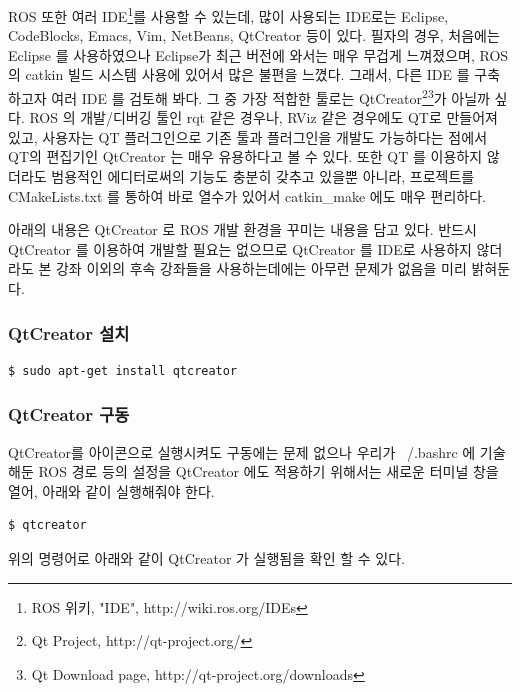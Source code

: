 ROS 또한 여러 IDE\footnote{ROS 위키, "IDE", http://wiki.ros.org/IDEs}를 사용할 수 있는데, 많이 사용되는 IDE로는 Eclipse, CodeBlocks, Emacs, Vim, NetBeans, QtCreator 등이 있다. 필자의 경우, 처음에는 Eclipse 를 사용하였으나 Eclipse가 최근 버전에 와서는 매우 무겁게 느껴졌으며, ROS의 catkin 빌드 시스템 사용에 있어서 많은 불편을 느꼈다. 그래서, 다른 IDE 를 구축하고자 여러 IDE 를 검토해 봐다. 그 중 가장 적합한 툴로는 QtCreator\footnote{Qt Project, http://qt-project.org/}\footnote{Qt Download page, http://qt-project.org/downloads}가 아닐까 싶다. ROS 의 개발/디버깅 툴인 rqt 같은 경우나, RViz 같은 경우에도 QT로 만들어져 있고, 사용자는 QT 플러그인으로 기존 툴과 플러그인을 개발도 가능하다는 점에서 QT의 편집기인 QtCreator 는 매우 유용하다고 볼 수 있다. 또한 QT 를 이용하지 않더라도 범용적인 에디터로써의 기능도 충분히 갖추고 있을뿐 아니라, 프로젝트를 CMakeLists.txt 를 통하여 바로 열수가 있어서 catkin\_make 에도 매우 편리하다.

아래의 내용은 QtCreator 로 ROS 개발 환경을 꾸미는 내용을 담고 있다. 반드시 QtCreator 를 이용하여 개발할 필요는 없으므로 QtCreator 를 IDE로 사용하지 않더라도 본 강좌 이외의 후속 강좌들을 사용하는데에는 아무런 문제가 없음을 미리 밝혀둔다.

\subsubsection{QtCreator 설치}

\begin{lstlisting}[language=ROS]
$ sudo apt-get install qtcreator
\end{lstlisting}

\subsubsection{QtCreator 구동}
QtCreator를 아이콘으로 실행시켜도 구동에는 문제 없으나 우리가 ~/.bashrc 에 기술해둔 ROS 경로 등의 설정을 QtCreator 에도 적용하기 위해서는 새로운 터미널 창을 열어, 아래와 같이 실행해줘야 한다.

\begin{lstlisting}[language=ROS]
$ qtcreator
\end{lstlisting}

\noindent
위의 명령어로 아래와 같이 QtCreator 가 실행됨을 확인 할 수 있다.

